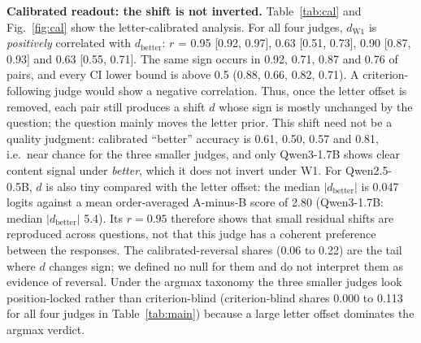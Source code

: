 \documentclass[conference]{IEEEtran}
\begin{document}
\textbf{Calibrated readout: the shift is not inverted.} Table~\ref{tab:cal} and Fig.~\ref{fig:cal} show the
letter-calibrated analysis. For all four judges, $d_\mathrm{W1}$ is \emph{positively} correlated with
$d_\mathrm{better}$: $r$ = 0.95 [0.92, 0.97], 0.63 [0.51, 0.73], 0.90 [0.87, 0.93] and 0.63 [0.55, 0.71]. The
same sign occurs in 0.92, 0.71, 0.87 and 0.76 of pairs, and every CI lower bound is above 0.5 (0.88, 0.66, 0.82,
0.71). A criterion-following judge would show a negative correlation. Thus, once the letter offset is removed, each
pair still produces a shift $d$ whose sign is mostly unchanged by the question; the question mainly moves the
letter prior. This shift need not be a quality judgment: calibrated ``better'' accuracy is 0.61, 0.50, 0.57 and
0.81, i.e.\ near chance for the three smaller judges, and only Qwen3-1.7B shows clear content signal under
\emph{better}, which it does not invert under W1. For Qwen2.5-0.5B, $d$ is also tiny compared with the letter
offset: the median $|d_\mathrm{better}|$ is 0.047 logits against a mean order-averaged A-minus-B score of 2.80
(Qwen3-1.7B: median $|d_\mathrm{better}|$ 5.4). Its $r=0.95$ therefore shows that small residual shifts are
reproduced across questions, not that this judge has a coherent preference between the responses. The calibrated-reversal shares (0.06 to 0.22) are the tail
where $d$ changes sign; we defined no null for them and do not interpret them as evidence of reversal. Under
the argmax taxonomy the three smaller judges look position-locked rather than criterion-blind (criterion-blind
shares 0.000 to 0.113 for all four judges in Table~\ref{tab:main}) because a large letter offset dominates the
argmax verdict.
\end{document}
